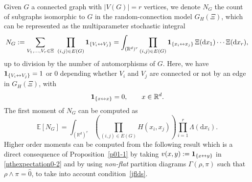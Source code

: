 \documentclass[bj,authoryear,noshowframe]{imsart}
\theoremstyle{plain}
\theoremstyle{remark}
\newcommand{\E}{\mathbb{E}}
\newcommand{\R}{\mathbb{R}}
\newcommand{\bone}{{\bf 1}}
\def\real{{\mathord{\mathbb R}}}
\begin{document}
  Given $G$ a connected graph with $|V(G)| = r$ vertices,
  we denote $N_G$ the count of subgraphs isomorphic to $G$ in the
  random-connection model $G_H( \Xi )$,
  which can be represented as the multiparameter stochastic integral 
 \begin{equation}
 \nonumber %
   N_G:=\sum_{V_1,\dots,V_r \in\Xi} \ 
   \prod_{(i,j) \in E(G)} 
   \bone_{\{V_i\leftrightarrow V_j\}}
   = \int_{(\real^d)^r}
   \prod_{(i,j) \in E(G)} 
   \bone_{\{x_i\leftrightarrow x_j\}}
   \ \! \Xi(\mathrm{d}x_1)\cdots \Xi(\mathrm{d}x_r), 
 \end{equation}
 up to division by the number of automorphisms of $G$.
  Here, we have $\bone_{\{V_i\leftrightarrow V_j\}}=1$ or $0$ depending
 whether $V_i$ and $V_j$ are connected or not by an edge
 in $G_H(\Xi)$, with 
 \begin{equation}
 \label{jflds} 
 \bone_{\{x\leftrightarrow x\}}=0, \qquad x\in \real^d. 
 \end{equation}
 \noindent
  The first moment of $N_G$ can be computed as 
 \begin{equation}
 \E [ N_G ] =\int_{(\R^d)^r}\left(\prod_{(i,j)\in E(G)}H(x_i,x_j)\right)\prod_{i=1}^r\Lambda(\mathrm{d}x_i).
 \end{equation}
  Higher order moments can be computed from the following result which
 is a direct consequence of Proposition~\ref{p01-1}
 by taking $v(x,y) : = \bone_{\{x \leftrightarrow y\}}$
 in \eqref{nthexpectation0-2} and by using
 {\em non-flat} partition diagrams $\Gamma(\rho,\pi )$
  such that $\rho \wedge \pi = \widehat{0}$, 
  to take into account condition~\eqref{jflds}.  
 
  \vspace{-0.2cm}
 
\end{document}
